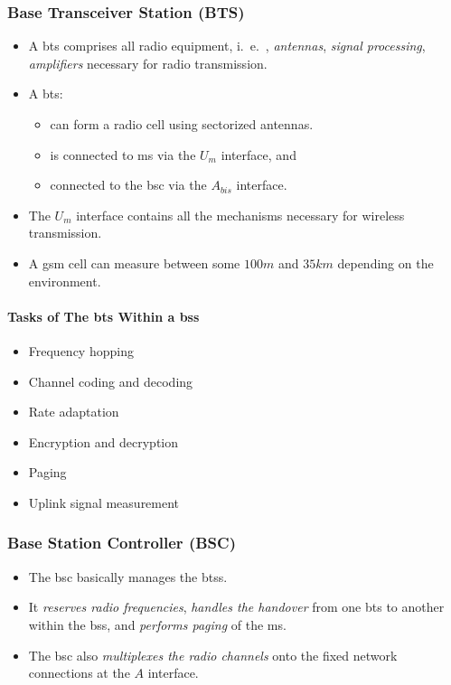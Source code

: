 \subsubsection[BTS]{Base Transceiver Station (BTS)}
\begin{itemize}
	\item A \gls{bts} comprises all radio equipment, i.\ e.\ , \textit{antennas}, \textit{signal processing}, \textit{amplifiers} necessary for radio transmission. 
	\item A \gls{bts}:
	\begin{itemize}
		\item can form a radio cell using sectorized antennas.
		\item is connected to \gls{ms} via the \( U_m \) {interface}, and 
		\item connected to the \gls{bsc} via the  \(A_{bis}\)  {interface}.
	\end{itemize}
\item The $ U_m $ interface contains all the mechanisms necessary for wireless transmission.
\item A \gls{gsm} cell can measure between some \(100 m\) and \(35 km\) depending on the environment. 
\end{itemize}


\paragraph*{Tasks of The \gls{bts} Within a \gls{bss}}
\begin{multicols}{2}
	\begin{itemize}
		\item Frequency hopping
		\item Channel coding and decoding
		\item Rate adaptation
		\item Encryption and decryption
		\item Paging
		\item Uplink signal measurement
	\end{itemize}
\end{multicols}


\subsubsection[BSC]{Base Station Controller (BSC)}
\begin{itemize}
	\item The \gls{bsc} basically manages the \gls{bts}s.
	\item It \textit{reserves radio frequencies}, \textit{handles the handover} from one \gls{bts} to another within the \gls{bss}, and \textit{performs paging} of the \gls{ms}. 
	\item The \gls{bsc} also \textit{multiplexes the radio channels} onto the fixed network connections at the \(A\) interface.
\end{itemize}


